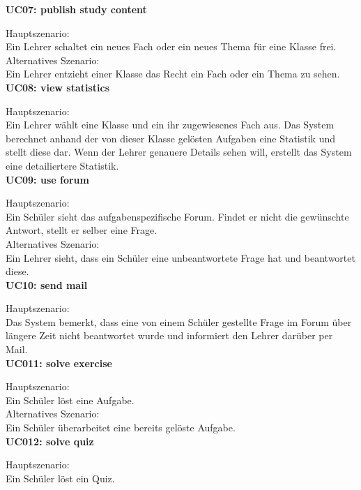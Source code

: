 \noindent \textbf{UC07: publish study content}

\noindent Hauptszenario: \\
Ein Lehrer schaltet ein neues Fach oder ein neues Thema für eine Klasse frei. \\

\noindent Alternatives Szenario: \\
Ein Lehrer entzieht einer Klasse das Recht ein Fach oder ein Thema zu sehen. \\


\noindent \textbf{UC08: view statistics}

\noindent Hauptszenario: \\
Ein Lehrer wählt eine Klasse und ein ihr zugewiesenes Fach aus. Das System berechnet anhand der von dieser Klasse gelösten Aufgaben eine Statistik und stellt diese dar. Wenn der Lehrer genauere Details sehen will, erstellt das System eine detailiertere Statistik. \\


\noindent \textbf{UC09: use forum}

\noindent Hauptszenario: \\
Ein Schüler sieht das aufgabenspezifische Forum. Findet er nicht die gewünschte Antwort, stellt er selber eine Frage. \\

\noindent Alternatives Szenario: \\
Ein Lehrer sieht, dass ein Schüler eine unbeantwortete Frage hat und beantwortet diese. \\


\noindent \textbf{UC10: send mail}

\noindent Hauptszenario: \\
Das System bemerkt, dass eine von einem Schüler gestellte Frage im Forum über längere Zeit nicht beantwortet wurde und informiert den Lehrer darüber per Mail. \\


\noindent \textbf{UC011: solve exercise}

\noindent Hauptszenario: \\
Ein Schüler löst eine Aufgabe. \\

\noindent Alternatives Szenario: \\
Ein Schüler überarbeitet eine bereits gelöste Aufgabe. \\


\noindent \textbf{UC012: solve quiz}

\noindent Hauptszenario: \\
Ein Schüler löst ein Quiz. \\

